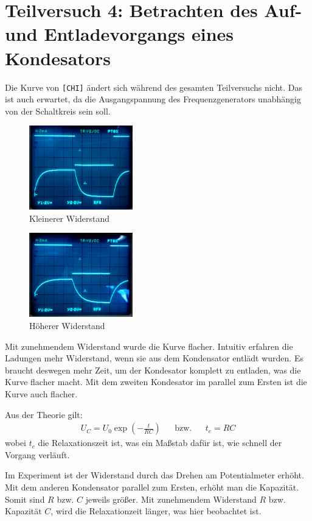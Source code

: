\section{Teilversuch 4: Betrachten des Auf- und Entladevorgangs eines Kondesators}
	Die Kurve von \texttt{[CHI]} ändert sich während des gesamten Teilversuchs nicht. Das ist auch erwartet, da die Ausgangspannung des Frequenzgenerators unabhängig von der Schaltkreis sein soll. 
	\begin{multicols}{2}
		\begin{figure}[H]
			\centering
			\includegraphics[width=0.4\textwidth]{images/low-widerstand.jpg}
			\caption{\centering Kleinerer Widerstand}
			\label{fig:low-widerstand}
			\vspace{-1em}
		\end{figure}
		\begin{figure}[H]
			\centering
			\includegraphics[width=0.4\textwidth]{images/high-widerstand.jpg}
			\caption{\centering Höherer Widerstand}
			\label{fig:high-widerstand}
			\vspace{-1em}
		\end{figure}
	\end{multicols}
	Mit zunehmendem Widerstand wurde die Kurve flacher. Intuitiv erfahren die Ladungen mehr Widerstand, wenn sie aus dem Kondensator entlädt wurden. Es braucht deswegen mehr Zeit, um der Kondesator komplett zu entladen, was die Kurve flacher macht. Mit dem zweiten Kondesator im parallel zum Ersten ist die Kurve auch flacher. 

	Aus der Theorie gilt:
	\begin{align}
	 	U_C = U_0 \exp\left(-\frac{t}{RC} \right) && \text{bzw.} && t_e = RC
	\end{align} 
	wobei $t_c$ die Relaxationszeit ist, was ein Maßstab dafür ist, wie schnell der Vorgang verläuft. 

	Im Experiment ist der Widerstand durch das Drehen am Potentialmeter erhöht. Mit dem anderen Kondensator parallel zum Ersten, erhöht man die Kapazität. Somit sind $R$ bzw. $C$ jeweils größer. Mit zunehmendem Widerstand $R$ bzw. Kapazität $C$, wird die Relaxationzeit länger, was hier beobachtet ist.